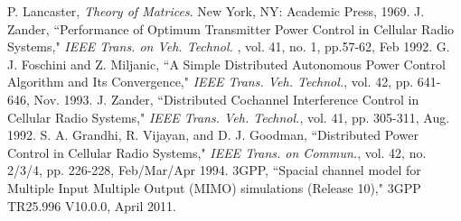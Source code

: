 \documentclass[conference,letterpaper,final,10pt]{IEEEtran}
\begin{document}
\begin{thebibliography}{99}
 P. Lancaster, \emph{Theory of Matrices}. New York, NY: Academic Press, 1969.
 J. Zander, ``Performance of Optimum Transmitter Power Control in Cellular Radio Systems," \emph{IEEE Trans. on Veh. Technol.} , vol. 41, no. 1, pp.57-62, Feb 1992.
 G. J. Foschini and Z. Miljanic, ``A Simple Distributed Autonomous Power Control Algorithm and Its Convergence," \emph{IEEE Trans. Veh. Technol.}, vol. 42, pp. 641-646, Nov. 1993.
 J. Zander, ``Distributed Cochannel Interference Control in Cellular Radio Systems," \emph{IEEE Trans. Veh. Technol.}, vol. 41, pp. 305-311, Aug. 1992.
 S. A. Grandhi, R. Vijayan, and D. J. Goodman, ``Distributed Power Control in Cellular Radio Systems," \emph{IEEE Trans. on Commun.}, vol. 42, no. 2/3/4, pp. 226-228, Feb/Mar/Apr 1994.
 3GPP, ``Spacial channel model for Multiple Input Multiple Output (MIMO) simulations (Release 10)," 3GPP TR25.996 V10.0.0, April 2011.
\end{thebibliography}
\end{document}
